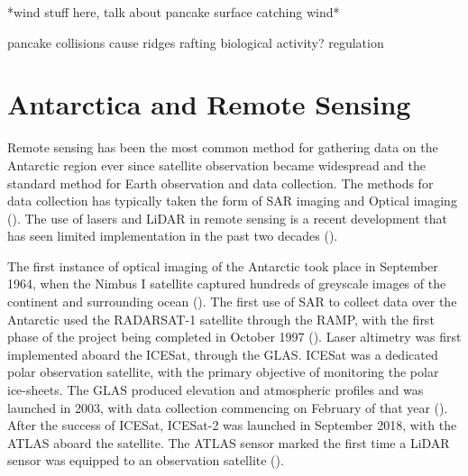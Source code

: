 *wind stuff here, talk about pancake surface catching wind*

pancake collisions cause ridges
rafting
biological activity?
regulation



\section{Antarctica and Remote Sensing}
\label{sec:ch2.section5}

Remote sensing has been the most common method for gathering data on the Antarctic region ever since satellite observation became widespread and the standard method for Earth observation and data collection. The methods for data collection has typically taken the form of \ac{SAR} imaging and Optical imaging (\cite{maslanikRemoteSensingAntarctica1990}). The use of lasers and \ac{LiDAR} in remote sensing is a recent development that has seen limited implementation in the past two decades (\cite{pettorelliSatelliteRemoteSensing2014}).

The first instance of optical imaging of the Antarctic took place in September 1964, when the Nimbus I satellite captured hundreds of greyscale images of the continent and surrounding ocean (\cite{meierNewEstimatesArctic2013}).
The first use of \ac{SAR} to collect data over the Antarctic used the RADARSAT-1 satellite through the \ac{RAMP}, with the first phase of the project being completed in October 1997 (\cite{jezekRADARSAT1AntarcticMapping2002}).
Laser altimetry was first implemented aboard the \ac{ICESat}, through the \ac{GLAS}. \ac{ICESat} was a dedicated polar observation satellite, with the primary objective of monitoring the polar ice-sheets. The \ac{GLAS} produced elevation and atmospheric profiles and was launched in 2003, with data collection commencing on February of that year (\cite{schutzOverviewICESatMission2005}).
After the success of \ac{ICESat}, ICESat-2 was launched in September 2018, with the \ac{ATLAS} aboard the satellite. The \ac{ATLAS} sensor marked the first time a \ac{LiDAR} sensor was equipped to an observation satellite (\cite{palmICESat2AtmosphericChannel2021}).

